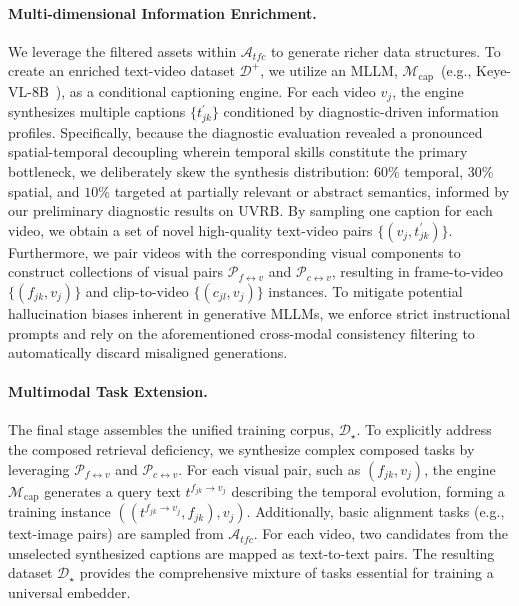 \paragraph{Multi-dimensional Information Enrichment.}
We leverage the filtered assets within $\mathcal{A}_{tfc}$ to generate richer data structures. To create an enriched text-video dataset $\mathcal{D}^{+}$, we utilize an MLLM, $\mathcal{M}_{\text{cap}}$~(e.g., Keye-VL-8B~\cite{team2025kwai}), as a conditional captioning engine. For each video $v_j$, the engine synthesizes multiple captions $\{t^{'}_{jk}\}$ conditioned by diagnostic-driven information profiles. Specifically, because the diagnostic evaluation revealed a pronounced spatial-temporal decoupling wherein temporal skills constitute the primary bottleneck, we deliberately skew the synthesis distribution: $60\%$ temporal, $30\%$ spatial, and $10\%$ targeted at partially relevant or abstract semantics, informed by our preliminary diagnostic results on UVRB. By sampling one caption for each video, we obtain a set of novel high-quality text-video pairs $\{(v_j, t^{'}_{jk})\}$. Furthermore, we pair videos with the corresponding visual components to construct collections of visual pairs $\mathcal{P}_{f \leftrightarrow v}$ and $\mathcal{P}_{c \leftrightarrow v}$, resulting in frame-to-video $\{(f_{jk}, v_j)\}$ and clip-to-video $\{(c_{jl}, v_j)\}$ instances. To mitigate potential hallucination biases inherent in generative MLLMs, we enforce strict instructional prompts and rely on the aforementioned cross-modal consistency filtering to automatically discard misaligned generations.

\paragraph{Multimodal Task Extension.}
The final stage assembles the unified training corpus, $\mathcal{D}_{\star}$. To explicitly address the composed retrieval deficiency, we synthesize complex composed tasks by leveraging $\mathcal{P}_{f \leftrightarrow v}$ and $\mathcal{P}_{c \leftrightarrow v}$. For each visual pair, such as $(f_{jk}, v_j)$, the engine $\mathcal{M}_{\text{cap}}$ generates a query text $t^{f_{jk} \to v_j}$ describing the temporal evolution, forming a training instance $((t^{f_{jk} \to v_j}, f_{jk}), v_j)$. Additionally, basic alignment tasks (e.g., text-image pairs) are sampled from $\mathcal{A}_{tfc}$. For each video, two candidates from the unselected synthesized captions are mapped as text-to-text pairs. The resulting dataset $\mathcal{D}_{\star}$ provides the comprehensive mixture of tasks essential for training a universal embedder.


